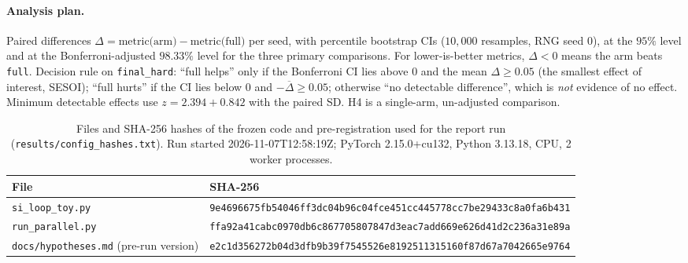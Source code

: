 \documentclass[11pt]{article}
\newcommand{\fh}{\texttt{final\_hard}}
\begin{document}
\paragraph{Analysis plan.} Paired differences $\Delta=\text{metric(arm)}-\text{metric(full)}$ per seed, with percentile bootstrap CIs ($10{,}000$ resamples, RNG seed $0$), at the $95\%$ level and at the Bonferroni-adjusted
$98.33\%$ level for the three primary comparisons. For lower-is-better metrics, $\Delta<0$ means the arm beats \texttt{full}.
Decision rule on \fh{}: ``full helps'' only if the Bonferroni CI lies above $0$ and the mean $\Delta\ge0.05$ (the smallest effect of interest, SESOI);
``full hurts'' if the CI lies below $0$ and $-\overline{\Delta}\ge 0.05$; otherwise ``no detectable difference'', which is \emph{not} evidence of no effect.
Minimum detectable effects use $z=2.394+0.842$ with the paired SD. H4 is a single-arm, un-adjusted comparison.

\begin{table}[t]
\centering\small
\caption{Files and SHA-256 hashes of the frozen code and pre-registration used for the report run (\texttt{results/config\_hashes.txt}). Run started 2026-11-07T12:58:19Z; PyTorch 2.15.0+cu132, Python 3.13.18, CPU, 2 worker processes.}
\label{tab:hash}
\scriptsize\begin{tabular}{ll}\toprule
File & SHA-256\\\midrule
\texttt{si\_loop\_toy.py} & \texttt{9e4696675fb54046ff3dc04b96c04fce451cc445778cc7be29433c8a0fa6b431}\\
\texttt{run\_parallel.py} & \texttt{ffa92a41cabc0970db6c867705807847d3eac7add669e626d41d2c236a31e89a}\\
\texttt{docs/hypotheses.md} (pre-run version) & \texttt{e2c1d356272b04d3dfb9b39f7545526e8192511315160f87d67a7042665e9764}\\\bottomrule
\end{tabular}
\end{table}
\end{document}
